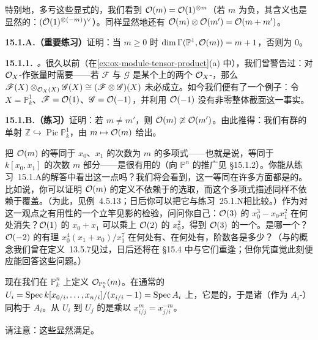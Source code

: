 特别地，多亏这些显式的\trTransitionFunction，我们看到 $\mathcal{O}(m)=\mathcal{O}(1)^{\otimes m}$（若 $m$ 为负，其含义也是显然的：$(\mathcal{O}(1)^{\otimes(-m)})^{\vee}$）。同样显然地还有 $\mathcal{O}(m)\otimes\mathcal{O}(m')=\mathcal{O}(m+m')$。

\textbf{15.1.A.（重要练习）}\quad 证明：当 $m\ge 0$ 时 $\dim\Gamma(\mathbb{P}^1,\mathcal{O}(m))=m+1$，否则为 $0$。

\textbf{15.1.1.}\ \emph{\trhExample{}。}\quad 很久以前（在\cref{ex:ox-module-tensor-product}(a) 中），我们曾警告过：对 $\mathcal{O}_X$-\trModule{}作张量时需要\trSheafification——若 $\mathscr{F}$ 与 $\mathscr{G}$ 是某个\trRingedSpace{}上的两个 $\mathcal{O}_X$-\trModule，那么 $\mathscr{F}(X)\otimes_{\mathcal{O}_X(X)}\mathscr{G}(X)\cong(\mathscr{F}\otimes\mathscr{G})(X)$ 未必成立。如今我们便有了一个例子：令 $X=\mathbb{P}^1_k$、$\mathscr{F}=\mathcal{O}(1)$、$\mathscr{G}=\mathcal{O}(-1)$，并利用 $\mathcal{O}(-1)$ 没有非零整体截面这一事实。

\textbf{15.1.B.（练习）}\quad 证明：若 $m\ne m'$，则 $\mathcal{O}(m)\ncong\mathcal{O}(m')$。由此推得：我们有群的单射 $\mathbb{Z}\hookrightarrow\operatorname{Pic}\mathbb{P}^1_k$，由 $m\mapsto\mathcal{O}(m)$ 给出。

把 $\mathcal{O}(m)$ 的\trGlobalSections{}等同于 $x_0$、$x_1$ 的次数为 $m$ 的\trHomogeneous{}多项式——也就是说，等同于 $k[x_0,x_1]$ 的次数 $m$ 部分——是很有用的（向 $\mathbb{P}^n$ 的推广见 \S15.1.2）。你能从\mbox{练习~15.1.A}的解答中看出这一点吗？我们将会看到，这一等同在许多方面都是\trNatural{}的。比如说，你可以证明 $\mathcal{O}(m)$ 的定义不依赖于\trAffine\trCover{}的选取，而这个多项式描述同样不依赖于覆盖。（为此，见\mbox{例~4.5.13}；日后你可以把它与\mbox{练习~25.1.N}相比较。）作为对这一观点之有用性的一个立竿见影的检验，问问你自己：$\mathcal{O}(3)$ 的\trSection{} $x_0^3-x_0x_1^2$ 在何处消失？$\mathcal{O}(1)$ 的\trSection{} $x_0+x_1$ 可以乘上 $\mathcal{O}(2)$ 的\trSection{} $x_0^2$，得到 $\mathcal{O}(3)$ 的一个\trSection。是哪一个？$\mathcal{O}(-2)$ 的有理\trSection{} $x_0^4(x_1+x_0)/x_1^7$ 在何处有\trZeros、在何处有\trPole，阶数各是多少？（\trZeros{}与\trPole{}的概念我们曾在\mbox{定义~13.5.7}见过，日后还将在 \S15.4 中与它们重逢；但你凭直觉此刻便应能回答这些问题。）

现在我们在\trProjectiveSpace{} $\mathbb{P}^n_k$ 上定义\trInvertibleSheaf{} $\mathcal{O}_{\mathbb{P}^n_k}(m)$。在通常的\trAffine\trOpenSet{} $U_i=\operatorname{Spec} k[x_{0/i},\dots,x_{n/i}]/(x_{i/i}-1)=\operatorname{Spec} A_i$ 上，它是\trTrivial{}的，于是诸\trSection{}（作为 $A_i$-\trModule）同构于 $A_i$。从 $U_i$ 到 $U_j$ 的\trTransitionFunction{}是乘以 $x_{i/j}^m=x_{j/i}^{-m}$。
\begin{center}
\end{center}
请注意：这些\trTransitionFunction{}显然满足\trCocycleCondition。

